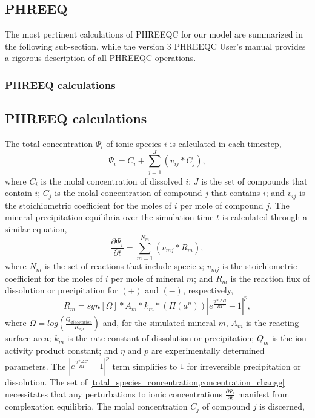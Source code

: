 \begin{supplementary}
\subsection{PHREEQ}
The most pertinent calculations of PHREEQC for our model are summarized in the following sub-section, while the version 3 PHREEQC User's manual provides a rigorous description of all PHREEQC operations.

\subsubsection{PHREEQ calculations}
\subsection{PHREEQ calculations}
The total concentration $\Psi_i$ of ionic species $i$ is calculated in each timestep, 
\begin{equation} \label{total_species_concentration}
    \Psi_i=C_i+\sum_{j=1}^{J}(v_{ij}*C_j),
\end{equation}
where $C_i$ is the molal concentration of dissolved $i$; $J$ is the set of compounds that contain $i$; $C_j$ is the molal concentration of compound $j$ that contains $i$; and $v_{ij}$ is the stoichiometric coefficient for the moles of $i$ per mole of compound $j$. The mineral precipitation equilibria over the simulation time $t$ is calculated through a similar equation, 
\begin{equation} \label{concentration_change}
    \frac{\partial \Psi_i}{\partial t}=\sum_{m=1}^{N_m}(v_{mj}*R_m),
\end{equation}
where $N_m$ is the set of reactions that include specie $i$; $v_{mj}$ is the stoichiometric coefficient for the moles of $i$ per mole of mineral $m$; and $R_m$ is the reaction flux of dissolution or precipitation for $(+)$ and $(-)$, respectively,
\begin{equation} \label{mineral_precipitation_reaction}
    R_m=sgn[\Omega]*A_m*k_m*(\Pi(a^n)) |e^{\frac{\eta*\Delta G}{RT}}-1|^p,
\end{equation}
where $\Omega = log\left(⁡\frac{Q_{dissolution}}{K_{sp}}\right)$ and, for the simulated mineral $m$, $A_m$ is the reacting surface area; $k_m$ is the rate constant of dissolution or precipitation; $Q_m$ is the ion activity product constant; and $\eta$ and $p$ are experimentally determined parameters. The $|e^{\frac{\eta * \Delta G}{RT}}-1|^p$ term simplifies to $1$ for irreversible precipitation or dissolution. The set of \cref{total_species_concentration,concentration_change} necessitates that any perturbations to ionic concentrations $\frac{\partial \Psi_i}{\partial t}$ manifest from complexation equilibria. The molal concentration $C_j$ of compound $j$ is discerned,

\end{supplementary}
